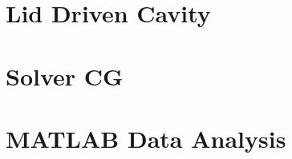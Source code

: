 \documentclass[a4paper,11pt]{report}
\begin{document}
\begin{appendices}
        \renewcommand{\currAppendixLetter}{D}
        \renewcommand{\currAppendixTitle}{Lid Driven Cavity}
        \renewcommand{\thesubsection}{\currAppendixLetter.\arabic{subsection}}
        \renewcommand{\thesection}{\currAppendixLetter.\arabic{section}}
        \renewcommand{\thechapter}{\currAppendixLetter}
        \renewcommand{\thesubsubsection}{\currAppendixLetter.\arabic{subsection}.\arabic{subsubsection}}
        \renewcommand{\lstlistingname}{Code Snippet}
        \chapter{\currAppendixTitle}
        \label{Appendix::LDC}
        
        
        \renewcommand{\currAppendixLetter}{E}
        \renewcommand{\currAppendixTitle}{Solver CG}
        \renewcommand{\thesubsection}{\currAppendixLetter.\arabic{subsection}}
        \renewcommand{\thesection}{\currAppendixLetter.\arabic{section}}
        \renewcommand{\thechapter}{\currAppendixLetter}
        \renewcommand{\thesubsubsection}{\currAppendixLetter.\arabic{subsection}.\arabic{subsubsection}}
        \renewcommand{\lstlistingname}{Code Snippet}
        \chapter{\currAppendixTitle}
        \label{Appendix::SCG}
        
        
        \renewcommand{\currAppendixLetter}{F}
        \renewcommand{\currAppendixTitle}{MATLAB Data Analysis}
        \renewcommand{\thesubsection}{\currAppendixLetter.\arabic{subsection}}
        \renewcommand{\thesection}{\currAppendixLetter.\arabic{section}}
        \renewcommand{\thechapter}{\currAppendixLetter}
        \renewcommand{\thesubsubsection}{\currAppendixLetter.\arabic{subsection}.\arabic{subsubsection}}
        \renewcommand{\lstlistingname}{Code Snippet}
        \renewcommand{\thelisting}{\currAppendixLetter.\arabic{listing}}
        \chapter{\currAppendixTitle}
        \label{Appendix::MATLAB}
        

    \end{appendices}
\end{document}
